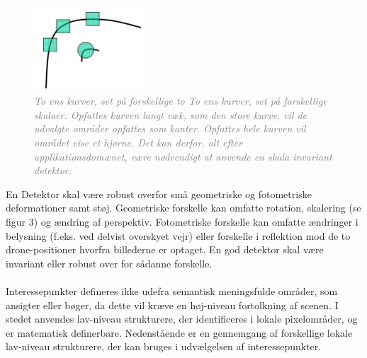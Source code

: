 \begin{figure}[H]
    \centering
    \includegraphics[width=0.37\textwidth]{fig/28.png}
     \vspace{-1em}
    \begin{center}    
       \caption{\textcolor{gray}{\footnotesize \textit{To ens kurver, set på forskellige to To ens kurver, set på forskellige skalaer. Opfattes kurven langt væk, som den store kurve, vil de udvalgte områder opfattes som kanter. Opfattes hele kurven vil området vise et hjørne. Det kan derfor, alt efter applikationsdomænet, være nødvendigt at anvende en skala invariant detektor.}}}
    \label{fig:skal}
     \end{center}
     \vspace{-2.5em}
  \end{figure} \noindent
En Detektor skal være robust overfor små geometriske og fotometriske deformationer samt støj. Geometriske forskelle kan omfatte rotation, skalering (se figur 3) og ændring af perspektiv.  Fotometriske forskelle kan omfatte ændringer i belysning (f.eks. ved delvist overskyet vejr) eller forskelle i reflektion mod de to drone-positioner hvorfra billederne er optaget. En god detektor skal være invariant eller robust over for sådanne forskelle.
\\
\\
Interessepunkter defineres ikke udefra semantisk meningsfulde områder, som ansigter eller bøger, da dette vil kræve en høj-niveau fortolkning af scenen. I stedet anvendes lav-niveau strukturere, der identificeres i lokale pixelområder, og er matematisk definerbare. Nedenstående er en gennemgang af forskellige lokale lav-niveau strukturere, der kan bruges i udvælgelsen af interessepunkter.
\newpage


